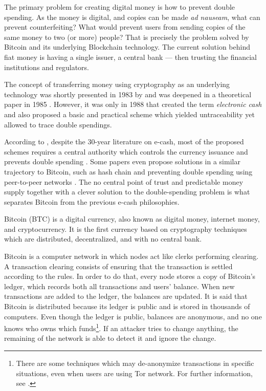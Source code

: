 The primary problem for creating digital money is how to prevent double spending. As the money is digital, and copies can be made \textit{ad nauseam}, what can prevent counterfeiting? What would prevent users from sending copies of the same money to two (or more) people? That is precisely the problem solved by Bitcoin and its underlying Blockchain technology. The current solution behind fiat money is having a single issuer, a central bank --- then trusting the financial institutions and regulators.

The concept of transferring money using cryptography as an underlying technology was shortly presented in 1983 by \citet{chaum1983blind} and was deepened in a theoretical paper in 1985 \citep{chaum1985security}. However, it was only in 1988 that \citet{chaum1988untraceable} created the term \emph{electronic cash} and also proposed a basic and practical scheme which yielded untraceability yet allowed to trace double spendings.

According to \citet{barber2012bitter}, despite the 30-year literature on e-cash, most of the proposed schemes requires a central authority which controls the currency issuance and prevents double spending \citep{chaum1983blind, okamoto1995efficient, camenisch2005compact, canard2007divisible}. Some papers even propose solutions in a similar trajectory to Bitcoin, such as hash chain \citep{zongkai2004new} and preventing double spending using peer-to-peer networks \citep{osipkov2007combating, hoepman2007distributed}. The no central point of trust and predictable money supply together with a clever solution to the double-spending problem is what separates Bitcoin from the previous e-cash philosophies.

Bitcoin (BTC) is a digital currency, also known as digital money, internet money, and cryptocurrency. It is the first currency based on cryptography techniques which are distributed, decentralized, and with no central bank.

Bitcoin is a computer network in which nodes act like clerks performing clearing. A transaction clearing consists of ensuring that the transaction is settled according to the rules. In order to do that, every node stores a copy of Bitcoin's ledger, which records both all transactions and users' balance. When new transactions are added to the ledger, the balances are updated. It is said that Bitcoin is distributed because its ledger is public and is stored in thousands of computers. Even though the ledger is public, balances are anonymous, and no one knows who owns which funds\footnote{There are some techniques which may de-anonymize transactions in specific situations, even when users are using Tor network. For further information, see \citet{shentu2015research, biryukov2014deanonymisation, jawaheri2018small}.}. If an attacker tries to change anything, the remaining of the network is able to detect it and ignore the change.

